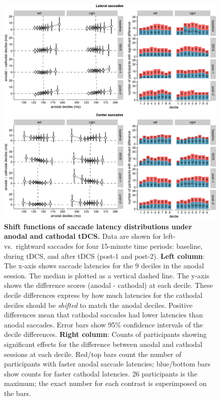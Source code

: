 \documentclass[11pt,]{memoir}
\begin{document}
\begin{figure}
\includegraphics[width=130mm]{sacc_tDCS_files/figures/figure_5_quantiles} \caption{\textbf{Shift functions of saccade latency distributions under anodal and cathodal tDCS.} Data are shown for left- vs.~rightward saccades for four 15-minute time periods: baseline, during tDCS, and after tDCS (post-1 and post-2). \textbf{Left column}: The x-axis shows saccade latencies for the 9 deciles in the anodal session. The median is plotted as a vertical dashed line. The y-axis shows the difference scores (anodal - cathodal) at each decile. These decile differences express by how much latencies for the cathodal deciles should be \emph{shifted} to match the anodal deciles. Positive differences mean that cathodal saccades had lower latencies than anodal saccades. Error bars show 95\% confidence intervals of the decile differences. \textbf{Right column}: Counts of participants showing significant effects for the difference between anodal and cathodal sessions at each decile. Red/top bars count the number of participants with faster anodal saccade latencies; blue/bottom bars show counts for faster cathodal latencies. 26 participants is the maximum; the exact number for each contrast is superimposed on the bars.}\label{fig:quantiles}
\end{figure}
\end{document}
